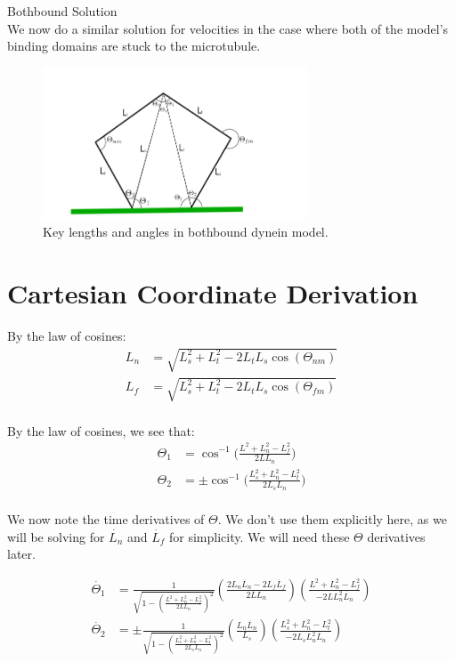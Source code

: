 \documentclass[11pt, landscape]{article}
\begin{document}
\clearpage
{\huge Bothbound Solution} \\
We now do a similar solution for velocities in the case where both of the model's binding domains are stuck to the microtubule.

\begin{figure}[h!]
  \caption{Key lengths and angles in bothbound dynein model.}
  \centering
    \includegraphics[width=0.7\textwidth]{../figures/bothbound_model.png}
\end{figure}

\section{Cartesian Coordinate Derivation}

By the law of cosines:
\begin{align}
  L_n &= \sqrt{L_{s}^2+L_{t}^2-2L_{t}L_{s}\cos(\Theta_{nm})}\\
  L_f &= \sqrt{L_{s}^2+L_{t}^2-2L_{t}L_{s}\cos(\Theta_{fm})}\\
\end{align}

By the law of cosines, we see that:
\begin{align}
  \Theta_{1} &= \cos^{-1}\bigg(\frac{L^2+L_{n}^2-L_{f}^2}{2LL_{n}}\bigg) \\
  \Theta_{2} &= \pm\cos^{-1}\bigg(\frac{L_{s}^2+L_{n}^2-L_{t}^2}{2L_{s}L_{n}}\bigg) \\
\end{align}

We now note the time derivatives of $\Theta$. We don't use them explicitly here, as we will be solving for $\dot{L_n}$ and $\dot{L_f}$ for simplicity. We will need these $\Theta$ derivatives later.

\begin{align}
  \dot{\Theta_{1}} &= \frac{1}{\sqrt{1-\left(\frac{L^2+L_{n}^2-L_{f}^2}{2LL_{n}}\right)^2}}\left(\frac{2L_n\dot{L_n} - 2L_f\dot{L_f}}{2LL_n}\right)\left(\frac{L^2+L_n^2-L_f^2}{-2LL_n^2\dot{L_n}}\right)\\
  \dot{\Theta_{2}} &= \pm \frac{1}{\sqrt{1-\left(\frac{L_{s}^2+L_{n}^2-L_{t}^2}{2L_{s}L_{n}}\right)^2}}\left(\frac{L_n\dot{L_n}}{L_s}\right)\left(\frac{L_s^2+L_{n}^2-L_t^2}{-2L_sL_n^2\dot{L_n}}\right)\\
\end{align}
\end{document}
